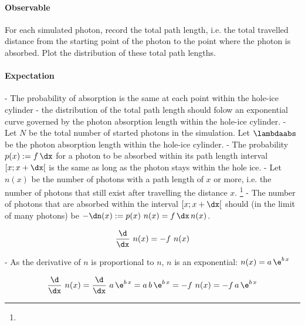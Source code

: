

\paragraph{Observable} For each simulated photon, record the total path length, i.e. the total travelled distance from the starting point of the photon to the point where the photon is absorbed. Plot the distribution of these total path lengths.

\paragraph{Expectation}

- The probability of absorption is the same at each point within the hole-ice cylinder
- the distribution of the total path length should folow an exponential curve governed by the photon absorption length within the hole-ice cylinder.
- Let $N$ be the total number of started photons in the simulation. Let $\lambdaabs$ be the photon absorption length within the hole-ice cylinder.
- The probability $p(x):=f\,\dx$ for a photon to be absorbed within its path length interval $[x; x + \dx[$ is the same as long as the photon stays within the hole ice.
- Let $n(x)$ be the number of photons with a path length of $x$ or more, i.e. the number of photons that still exist after travelling the distance $x$. \footnote{}
- The number of photons that are absorbed within the interval $[x; x + \dx[$ should (in the limit of many photons) be $-\dn(x) := p(x)\ n(x) = f\,\dx\,n(x)$.

$$ \frac{\d}{\dx}\ n(x) = -f\ n(x) $$

- As the derivative of $n$ is proportional to $n$, $n$ is an exponential: $n(x) = a\,\e^{b\,x}$

$$ \frac{\d}{\dx}\ n(x)
  = \frac{\d}{\dx}\ a\,\e^{b\,x}
  = a\,b\,\e^{b\,x}
  = -f\ n(x)
  = -f\,a\,\e^{b\,x} $$

